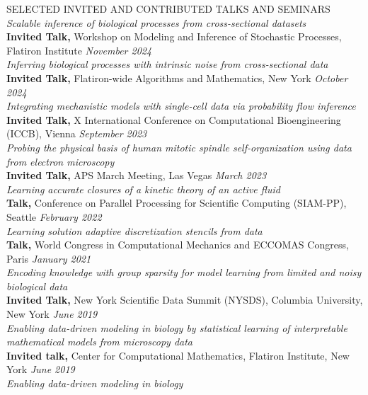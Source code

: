 \documentclass{resume} %
\begin{document}
\begin{rSection}{\small SELECTED INVITED AND CONTRIBUTED TALKS AND SEMINARS}
{\small \textit{Scalable inference of biological processes from cross-sectional datasets} }
\\
{ \small \textbf{Invited Talk,} Workshop on Modeling and Inference of Stochastic Processes, Flatiron Institute} \hfill{\small \textit{November 2024}} \\
{\small \textit{Inferring biological processes with intrinsic noise from cross-sectional data} }
\\
{ \small \textbf{Invited Talk,} Flatiron-wide Algorithms and Mathematics, New York} \hfill{\small \textit{October 2024}} \\
{\small \textit{Integrating mechanistic models with single-cell data via probability flow inference} }
\\
{  \small \textbf{Invited Talk,} \small X International Conference on Computational Bioengineering (ICCB), Vienna} \hfill {\small \textit{September 2023}}\\
{\small \textit{Probing the physical basis of human mitotic spindle self-organization using data from electron
microscopy}}
\\
{ \small \textbf{Invited Talk,} {APS March Meeting, Las Vegas}}  \hfill {\small \textit{March 2023}} \\
{\small \textit{Learning accurate closures of a kinetic theory of an active fluid} }
\\
{\small \textbf{Talk,} Conference on Parallel Processing for Scientific Computing (SIAM-PP), Seattle} \hfill {\small \textit{February 2022}}\\
{\small \textit{Learning solution adaptive discretization stencils from data}}
\\
{\small \textbf{Talk,}  World Congress in Computational Mechanics and ECCOMAS Congress, Paris} \hfill {\small \textit{January 2021}}\\
{\small \textit{Encoding knowledge with group sparsity for model learning from limited and noisy biological data}}
\\
{ \small \textbf{Invited Talk,} New York Scientific Data Summit (NYSDS), Columbia University, New York} \hfill{\small \textit{June 2019}} \\
{\small \textit{Enabling data-driven modeling in biology by statistical learning of interpretable mathematical models from microscopy data} }
\\
{\small \textbf{Invited talk,} Center for Computational Mathematics, Flatiron Institute, New York} \hfill {\small \textit{June 2019}}\\
{\small \textit{Enabling data-driven modeling in biology}}


\end{rSection}
\end{document}
